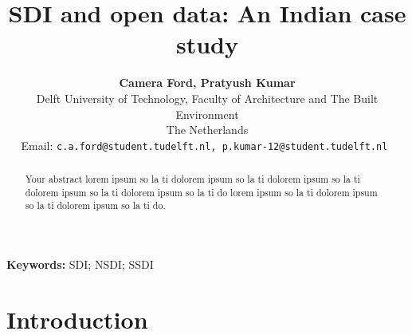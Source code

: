 \documentclass[a4paper]{article}
\begin{document}
\title{\textbf{SDI and open data: An Indian case study} }

\author{\small \textbf{Camera Ford, Pratyush Kumar} \\
        \small Delft University of Technology, Faculty of Architecture and The Built Environment \\
        \small The Netherlands\\
        \small Email: \tt{c.a.ford@student.tudelft.nl, p.kumar-12@student.tudelft.nl}
}


\date{}
\maketitle

\begin{abstract}
\noindent Your abstract
lorem ipsum so la ti dolorem ipsum so la ti dolorem ipsum so la ti dolorem 
ipsum so la ti dolorem ipsum so la ti do
lorem ipsum so la ti dolorem ipsum so la ti dolorem ipsum so la ti do.

\end{abstract}

\small \textbf{Keywords: } SDI; NSDI; SSDI

\section{Introduction}



\newpage


\end{document}
